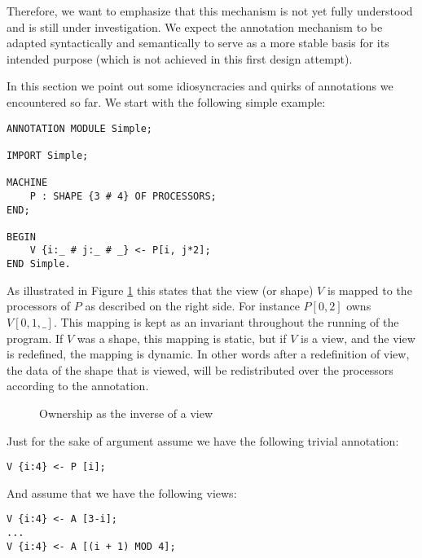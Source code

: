 Therefore, we want to emphasize that this mechanism is not yet fully
understood and is still under investigation. We expect the annotation
mechanism to be adapted syntactically and semantically to serve as a
more stable basis for its intended purpose (which is not achieved in
this first design attempt).

In this section we point out some idiosyncracies and quirks of
annotations we encountered so far. We start with the following simple
example:

\begin{verbatim}
ANNOTATION MODULE Simple;

IMPORT Simple;

MACHINE
    P : SHAPE {3 # 4} OF PROCESSORS;
END;

BEGIN
    V {i:_ # j:_ # _} <- P[i, j*2];
END Simple.
\end{verbatim}

As illustrated in Figure \ref{VPannot} this states that the view (or
shape) $V$ is mapped to the processors of $P$ as described on the
right side. For instance $P[0, 2]$ owns $V[0, 1,\_]$. This mapping is
kept as an invariant throughout the running of the program. If $V$ was
a shape, this mapping is static, but if $V$ is a view, and the view is
redefined, the mapping is dynamic. In other words after a redefinition
of view, the data of the shape that is viewed, will be redistributed
over the processors according to the annotation.

\begin{figure}
\begin{center}
\begin{minipage}{0.5\textwidth}
\end{minipage}
\caption{Ownership as the inverse of a view \label{VPannot}}
\end{center}
\end{figure}

Just for the sake of argument assume we have the following trivial
annotation:

\begin{verbatim}
V {i:4} <- P [i];
\end{verbatim}

And assume that we have the following views:

\begin{verbatim}
V {i:4} <- A [3-i];
...
V {i:4} <- A [(i + 1) MOD 4];
\end{verbatim}


